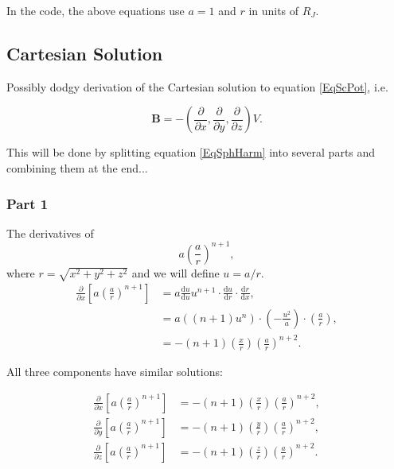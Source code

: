 \documentclass[]{article}
\begin{document}
	In the code, the above equations use $a =1$ and $r$ in units of $R_J$.
	
	\subsection{Cartesian Solution}
		
		Possibly dodgy derivation of the Cartesian solution to equation \ref{EqScPot}, i.e.
		
		\begin{equation}
			\mathbf{B} = -\left(\frac{\partial}{\partial x},\frac{\partial}{\partial y},\frac{\partial}{\partial z}\right) V. \label{EqSphHarmCart}
		\end{equation}
	
		This will be done by splitting equation \ref{EqSphHarm} into several parts and combining them at the end...
		
		\subsubsection{Part 1}
			
			The derivatives of 
			\begin{equation} 
				a \left(\frac{a}{r}\right)^{n+1},
			\end{equation}
			where $r = \sqrt{x^2 + y^2 + z^2}$ and we will define $u = a/r$.
			\begin{align}
				\frac{\partial}{\partial x} \left[ a \left( \frac{a}{r}\right)^{n+1} \right] &= a \frac{\text{d} u}{\text{d} u} u^{n+1} \cdot \frac{\text{d} u}{\text{d} r} \cdot \frac{\text{d} r}{\text{d} x},\\
				&= a\left((n+1)u^n\right)\cdot \left(-\frac{u^2}{a}\right) \cdot \left( \frac{a}{r}\right), \\
				&= -(n+1)\left(\frac{x}{r}\right)\left(\frac{a}{r}\right)^{n+2}.
			\end{align}
			
			All three components have similar solutions:
			
			\begin{align}
				\frac{\partial}{\partial x} \left[ a \left( \frac{a}{r}\right)^{n+1} \right] &= -(n+1)\left(\frac{x}{r}\right)\left(\frac{a}{r}\right)^{n+2}, \\
				\frac{\partial}{\partial y} \left[ a \left( \frac{a}{r}\right)^{n+1} \right] &= -(n+1)\left(\frac{y}{r}\right)\left(\frac{a}{r}\right)^{n+2}, \\
				\frac{\partial}{\partial z} \left[ a \left( \frac{a}{r}\right)^{n+1} \right] &= -(n+1)\left(\frac{z}{r}\right)\left(\frac{a}{r}\right)^{n+2}.
			\end{align}
		
\end{document}
